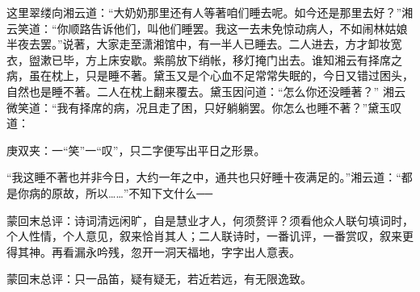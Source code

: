 \begin{parag}
    这里翠缕向湘云道：“大奶奶那里还有人等著咱们睡去呢。如今还是那里去好？”湘云笑道：“你顺路告诉他们，叫他们睡罢。我这一去未免惊动病人，不如闹林姑娘半夜去罢。”说著，大家走至潇湘馆中，有一半人已睡去。二人进去，方才卸妆宽衣，盥漱已毕，方上床安歇。紫鹃放下绡帐，移灯掩门出去。谁知湘云有择席之病，虽在枕上，只是睡不著。黛玉又是个心血不足常常失眠的，今日又错过困头，自然也是睡不著。二人在枕上翻来覆去。黛玉因问道：“怎么你还没睡著？” 湘云微笑道：“我有择席的病，况且走了困，只好躺躺罢。你怎么也睡不著？”黛玉叹道：\begin{note}庚双夹：一“笑”一“叹”，只二字便写出平日之形景。\end{note}“我这睡不著也并非今日，大约一年之中，通共也只好睡十夜满足的。”湘云道：“都是你病的原故，所以……”不知下文什么──
\end{parag}


\begin{parag}
    \begin{note}蒙回末总评：诗词清远闲旷，自是慧业才人，何须赘评？须看他众人联句填词时，个人性情，个人意见，叙来恰肖其人；二人联诗时，一番讥评，一番赏叹，叙来更得其神。再看漏永吟残，忽开一洞天福地，字字出人意表。\end{note}
\end{parag}


\begin{parag}
    \begin{note}蒙回末总评：只一品笛，疑有疑无，若近若远，有无限逸致。\end{note}
\end{parag}